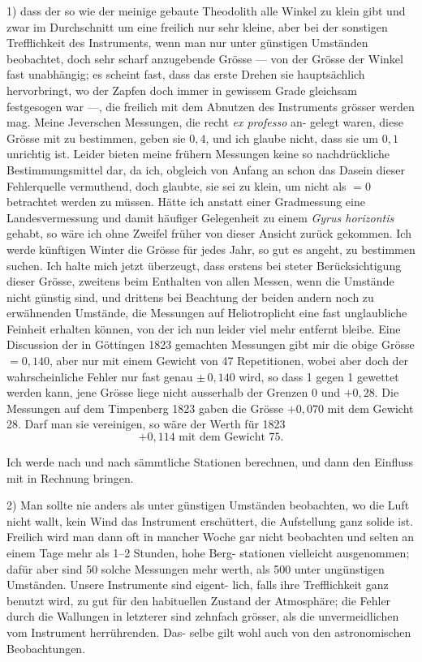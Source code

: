 \documentclass[12pt,a4paper]{article}
\theoremstyle{plain}
\theoremstyle{definition}
\theoremstyle{remark}
\begin{document}
1) dass der so wie der meinige gebaute Theodolith alle Winkel zu klein
gibt und zwar im Durchschnitt um eine freilich nur sehr kleine, aber bei der
sonstigen Trefflichkeit des Instruments, wenn man nur unter günstigen
Umständen beobachtet, doch sehr scharf anzugebende Grösse --- von der
Grösse der Winkel fast unabhängig; es scheint fast, dass das erste Drehen
sie hauptsächlich hervorbringt, wo der Zapfen doch immer in gewissem Grade
gleichsam festgesogen war ---, die freilich mit dem Abnutzen des Instruments
grösser werden mag. Meine Jeverschen Messungen, die recht \textit{ex professo} an-
gelegt waren, diese Grösse mit zu bestimmen, geben sie $0{,}4$, und ich glaube
nicht, dass sie um $0{,}1$ unrichtig ist. Leider bieten meine frühern Messungen
keine so nachdrückliche Bestimmungsmittel dar, da ich, obgleich von Anfang
an schon das Dasein dieser Fehlerquelle vermuthend, doch glaubte, sie sei zu
klein, um nicht als $=0$ betrachtet werden zu müssen. Hätte ich anstatt
einer Gradmessung eine Landesvermessung und damit häufiger Gelegenheit zu
einem \textit{Gyrus horizontis} gehabt, so wäre ich ohne Zweifel früher von dieser
Ansicht zurück gekommen. Ich werde künftigen Winter die Grösse für jedes
Jahr, so gut es angeht, zu bestimmen suchen. Ich halte mich jetzt überzeugt,
dass erstens bei steter Berücksichtigung dieser Grösse, zweitens beim Enthalten
von allen Messen, wenn die Umstände nicht günstig sind, und drittens bei
Beachtung der beiden andern noch zu erwähnenden Umstände, die Messungen
auf Heliotroplicht eine fast unglaubliche Feinheit erhalten können, von der ich
nun leider viel mehr entfernt bleibe. Eine Discussion der in Göttingen 1823
gemachten Messungen gibt mir die obige Grösse $= 0{,}140$, aber nur mit einem
Gewicht von 47 Repetitionen, wobei aber doch der wahrscheinliche Fehler nur
fast genau $\pm\,0{,}140$ wird, so dass 1 gegen 1 gewettet werden kann, jene Grösse
liege nicht ausserhalb der Grenzen $0$ und $+0{,}28$. Die Messungen auf dem
Timpenberg 1823 gaben die Grösse $+0{,}070$ mit dem Gewicht 28. Darf man
sie vereinigen, so wäre der Werth für 1823
\[+0{,}114 \text{ mit dem Gewicht } 75.\]

Ich werde nach und nach sämmtliche Stationen berechnen, und dann
den Einfluss mit in Rechnung bringen.

2) Man sollte nie anders als unter günstigen Umständen beobachten, wo
die Luft nicht wallt, kein Wind das Instrument erschüttert, die Aufstellung
ganz solide ist. Freilich wird man dann oft in mancher Woche gar nicht
beobachten und selten an einem Tage mehr als 1--2 Stunden, hohe Berg-
stationen vielleicht ausgenommen; dafür aber sind 50 solche Messungen mehr
werth, als 500 unter ungünstigen Umständen. Unsere Instrumente sind eigent-
lich, falls ihre Trefflichkeit ganz benutzt wird, zu gut für den habituellen
Zustand der Atmosphäre; die Fehler durch die Wallungen in letzterer sind
zehnfach grösser, als die unvermeidlichen vom Instrument herrührenden. Das-
selbe gilt wohl auch von den astronomischen Beobachtungen.
\end{document}
